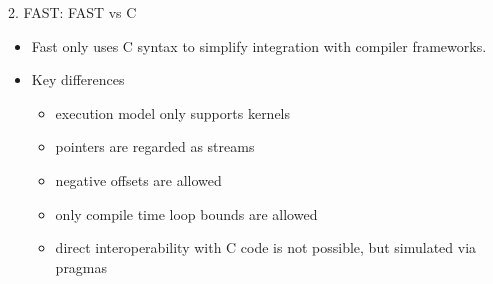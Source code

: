 \begin{frame}{2. FAST: FAST vs C}
\begin{itemize}
\item Fast only uses C syntax to simplify integration with compiler
  frameworks.
\item  Key differences
\begin{itemize}
\item execution model only supports kernels
\item pointers are regarded as   streams
\item negative offsets are allowed
\item only compile time loop bounds are allowed
\item direct interoperability with C code is not possible, but
  simulated via pragmas
\end{itemize}
\end{itemize}

\end{frame}